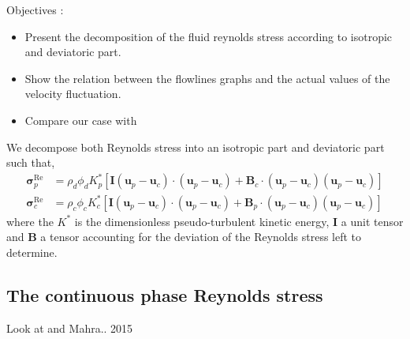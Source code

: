 
Objectives : 
\begin{itemize}
    \item Present the decomposition of the fluid reynolds stress according to isotropic and deviatoric part.
    \item Show the relation between the flowlines graphs and the actual values of the velocity fluctuation.
    \item Compare our case with \citet{almeras2019fluctuations}
\end{itemize}



We decompose both Reynolds stress into an isotropic part and deviatoric part such that, 
\begin{align}
    \bm{\sigma}^{\text{Re}}_p &=  \rho_d \phi_d K^*_p
    \left[
        \textbf{I}(\textbf{u}_p - \textbf{u}_c)\cdot (\textbf{u}_p - \textbf{u}_c) 
        +\textbf{B}_c \cdot (\textbf{u}_p - \textbf{u}_c)(\textbf{u}_p - \textbf{u}_c)
    \right]\\
    \bm{\sigma}^{\text{Re}}_c &=  \rho_c \phi_c K_c^*
    \left[
        \textbf{I}(\textbf{u}_p - \textbf{u}_c)\cdot (\textbf{u}_p - \textbf{u}_c) 
        +\textbf{B}_p \cdot (\textbf{u}_p - \textbf{u}_c)(\textbf{u}_p - \textbf{u}_c)
    \right]
\end{align}
where the $K^*$ is the dimensionless pseudo-turbulent  kinetic energy, $\textbf{I}$ a unit tensor and $\textbf{B}$ a tensor accounting for the deviation of the Reynolds stress left to determine. 

\subsection{The continuous phase Reynolds stress}
Look at \citep{wang2021numerical} and Mahra.. 2015 



